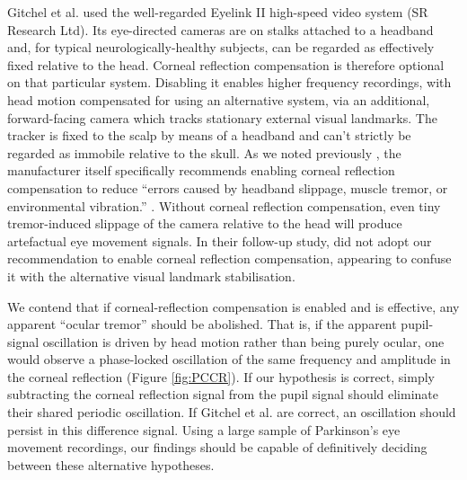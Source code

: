 \documentclass[jou,a4paper]{apa6}
\begin{document}
Gitchel et al. used the well-regarded Eyelink II high-speed video system (SR Research Ltd). Its eye-directed cameras are on stalks attached to a headband and, for typical neurologically-healthy subjects, can be regarded as effectively fixed relative to the head. Corneal reflection compensation is therefore optional on that particular system. Disabling it enables higher frequency recordings, with head motion compensated for using an alternative system, via an additional, forward-facing camera which tracks stationary external visual landmarks. The tracker is fixed to the scalp by means of a headband and can't strictly be regarded as immobile relative to the skull. As we noted previously \citep{MacAskill2013Ocular-Tremor-i}, the manufacturer itself specifically recommends enabling corneal reflection compensation to reduce ``errors caused by headband slippage, muscle tremor, or environmental vibration.'' \citep{SR-Research-Ltd2002EyeLink-II-User}. Without corneal reflection compensation, even tiny tremor-induced slippage of the camera relative to the head will produce artefactual eye movement signals. In their follow-up study, \cite{Gitchel2014Experimental-su} did not adopt our recommendation to enable corneal reflection compensation, appearing to confuse it with the alternative visual landmark stabilisation.

We contend that if corneal-reflection compensation is enabled and is effective, any apparent ``ocular tremor'' should be abolished. That is, if the apparent pupil-signal oscillation is driven by head motion rather than being purely ocular, one would observe a phase-locked oscillation of the same frequency and amplitude in the corneal reflection (Figure \ref{fig:PCCR}). If our hypothesis is correct, simply subtracting the corneal reflection signal from the pupil signal should eliminate their shared periodic oscillation. If Gitchel et al. are correct, an oscillation should persist in this difference signal. Using a large sample of Parkinson's eye movement recordings, our findings should be capable of definitively deciding between these alternative hypotheses.
\end{document}
